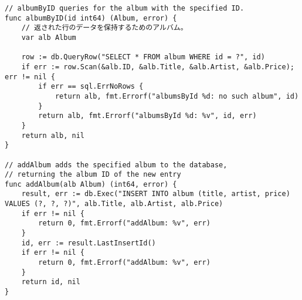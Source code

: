 \begin{lstlisting}[numbers=none]
// albumByID queries for the album with the specified ID.
func albumByID(id int64) (Album, error) {
    // 返された行のデータを保持するためのアルバム。
    var alb Album

    row := db.QueryRow("SELECT * FROM album WHERE id = ?", id)
    if err := row.Scan(&alb.ID, &alb.Title, &alb.Artist, &alb.Price); err != nil {
        if err == sql.ErrNoRows {
            return alb, fmt.Errorf("albumsById %d: no such album", id)
        }
        return alb, fmt.Errorf("albumsById %d: %v", id, err)
    }
    return alb, nil
}

// addAlbum adds the specified album to the database,
// returning the album ID of the new entry
func addAlbum(alb Album) (int64, error) {
    result, err := db.Exec("INSERT INTO album (title, artist, price) VALUES (?, ?, ?)", alb.Title, alb.Artist, alb.Price)
    if err != nil {
        return 0, fmt.Errorf("addAlbum: %v", err)
    }
    id, err := result.LastInsertId()
    if err != nil {
        return 0, fmt.Errorf("addAlbum: %v", err)
    }
    return id, nil
}
\end{lstlisting}
